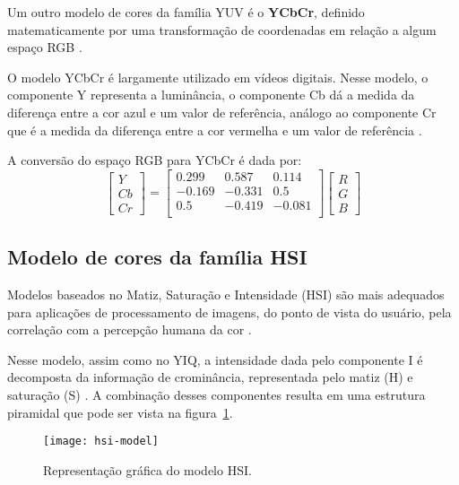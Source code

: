 Um outro modelo de cores da família YUV é o \textbf{YCbCr}, definido matematicamente por uma transformação de coordenadas em relação a algum espaço RGB \citep{pedrini:08}.

O modelo YCbCr é largamente utilizado em vídeos digitais. Nesse modelo, o componente Y representa a luminância, o componente Cb dá a medida da diferença entre a cor azul e um valor de referência, análogo ao componente Cr que é a medida da diferença entre a cor vermelha e um valor de referência \citep{pedrini:08}.

A conversão do espaço RGB para YCbCr é dada por:\\
\begin{equation}
  \begin{bmatrix}
    Y \\ Cb \\ Cr
  \end{bmatrix} = 
  \begin{bmatrix}
     0.299 &  0.587 &  0.114 \\
    -0.169 & -0.331 &  0.5   \\
     0.5   & -0.419 & -0.081 \\
  \end{bmatrix}
  \begin{bmatrix}
    R \\ G \\ B
  \end{bmatrix}
\end{equation}


\subsection{Modelo de cores da família HSI}
\label{sec:modelo_cores_hsi}

Modelos baseados no Matiz, Saturação e Intensidade (HSI) são mais adequados para aplicações de processamento de imagens, do ponto de vista do usuário, pela correlação com a percepção humana da cor \citep{konstantinos:00}.

Nesse modelo, assim como no YIQ, a intensidade dada pelo componente I é decomposta da informação de crominância, representada pelo matiz (H) e saturação (S) \citep{konstantinos:00}. A combinação desses componentes resulta em uma estrutura piramidal que pode ser vista na figura~\ref{fig:hsi-model}.

\begin{figure}[!h]
  \centering
  \texttt{[image: hsi-model]}
  \caption{Representação gráfica do modelo HSI.}
  \label{fig:hsi-model} 
\end{figure}

